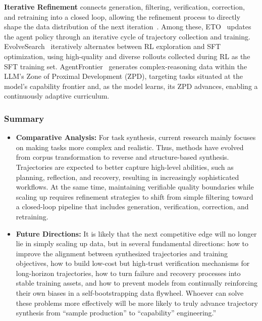 \documentclass{llmxive}
\begin{document}
\textbf{Iterative Refinement} connects generation, filtering, verification, correction, and retraining into a closed loop, allowing the refinement process to directly shape the data distribution of the next iteration~\cite{ETO, UI-TARS, EvolveSearch, Mobile-Agent-v3.5, UI-TARS-2, AgentFrontier}. Among these, ETO~\cite{ETO} updates the agent policy through an iterative cycle of trajectory collection and training. EvolveSearch~\cite{EvolveSearch} iteratively alternates between RL exploration and SFT optimization, using high-quality and diverse rollouts collected during RL as the SFT training set. AgentFrontier~\cite{AgentFrontier} generates complex-reasoning data within the LLM’s Zone of Proximal Development (ZPD), targeting tasks situated at the model’s capability frontier and, as the model learns, its ZPD advances, enabling a continuously adaptive curriculum.



\subsubsection{Summary}
\begin{tcolorbox}[takeaway,title={Takeaway 6.3}] %
\begin{itemize}
\item \textbf{Comparative Analysis:} For task synthesis, current research mainly focuses on making tasks more complex and realistic. Thus, methods have evolved from corpus transformation to reverse and structure-based synthesis. Trajectories are expected to better capture high-level abilities, such as planning, reflection, and recovery, resulting in increasingly sophisticated workflows. At the same time, maintaining verifiable quality boundaries while scaling up requires refinement strategies to shift from simple filtering toward a closed-loop pipeline that includes generation, verification, correction, and retraining.

\item \textbf{Future Directions:} It is likely that the next competitive edge will no longer lie in simply scaling up data, but in several fundamental directions: how to improve the alignment between synthesized trajectories and training objectives, how to build low-cost but high-trust verification mechanisms for long-horizon trajectories, how to turn failure and recovery processes into stable training assets, and how to prevent models from continually reinforcing their own biases in a self-bootstrapping data flywheel. Whoever can solve these problems more effectively will be more likely to truly advance trajectory synthesis from ``sample production'' to ``capability'' engineering.”


\end{itemize}
\end{tcolorbox}
\end{document}
